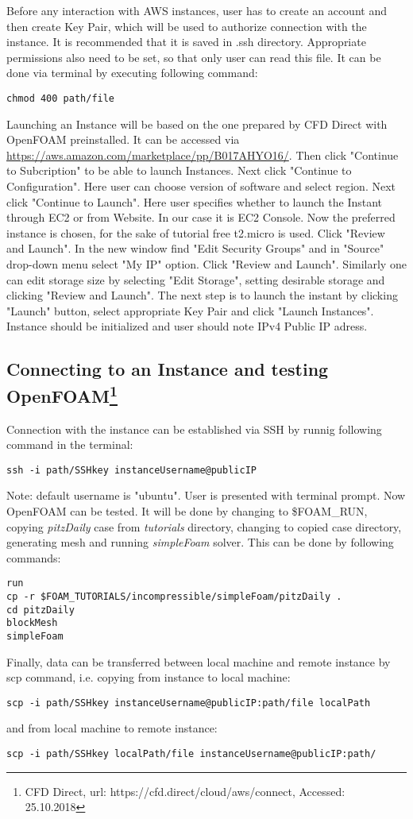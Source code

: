 \documentclass[12pt,english]{article}
\begin{document}
Before any interaction with AWS instances, user has to create an account and then create Key Pair, which will be used to authorize connection with the instance. It is recommended that it is saved in .ssh directory. Appropriate permissions also need to be set, so that only user can read this file. It can be done via terminal by executing following command:
\begin{lstlisting}
chmod 400 path/file
\end{lstlisting}
Launching an Instance will be based on the one prepared by CFD Direct with OpenFOAM preinstalled. It can be accessed via \url{https://aws.amazon.com/marketplace/pp/B017AHYO16/}. Then click "Continue to Subcription" to be able to launch Instances. Next click "Continue to Configuration". Here user can choose version of software and select region. Next click "Continue to Launch".
Here user specifies whether to launch the Instant through EC2 or from Website. In our case it is EC2 Console. Now the preferred instance is chosen, for the sake of tutorial free t2.micro is used. Click "Review and Launch". In the new window find "Edit Security Groups" and in "Source" drop-down menu select "My IP" option. Click "Review and Launch". Similarly one can edit storage size by selecting "Edit Storage", setting desirable storage and clicking "Review and Launch".
The next step is to launch the instant by clicking "Launch" button, select appropriate Key Pair and click "Launch Instances". Instance should be initialized and user should note IPv4 Public IP adress.

\subsection{Connecting to an Instance and testing OpenFOAM\footnote{CFD Direct, url: https://cfd.direct/cloud/aws/connect, Accessed: 25.10.2018}}

Connection with the instance can be established via SSH by runnig following command in the terminal:
\begin{lstlisting}
ssh -i path/SSHkey instanceUsername@publicIP
\end{lstlisting}	
Note: default username is "ubuntu".
User is presented with terminal prompt. Now OpenFOAM can be tested. It will be done by changing to \$FOAM\_RUN, copying \textit{pitzDaily} case from \textit{tutorials} directory, changing to copied case directory, generating mesh and running \textit{simpleFoam} solver. This can be done by following commands:
\begin{lstlisting}
run
cp -r $FOAM_TUTORIALS/incompressible/simpleFoam/pitzDaily .
cd pitzDaily
blockMesh
simpleFoam
\end{lstlisting}
Finally, data can be transferred between local machine and remote instance by scp command, i.e. copying from instance to local machine:
\begin{lstlisting}
scp -i path/SSHkey instanceUsername@publicIP:path/file localPath
\end{lstlisting}
and from local machine to remote instance:
\begin{lstlisting}
scp -i path/SSHkey localPath/file instanceUsername@publicIP:path/
\end{lstlisting}
\end{document}
